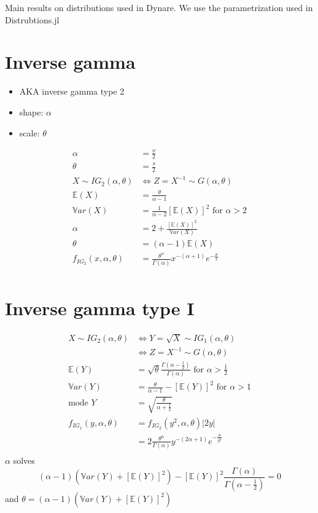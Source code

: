 \documentclass{article}
\begin{document}
Main results on distributions used in Dynare. We use the
parametrization used in Distrubtions.jl

\section{Inverse gamma}
\begin{itemize}
\item AKA inverse gamma type 2
\item shape: $\alpha$
\item scale: $\theta$
\end{itemize}
\begin{align*}
\alpha &= \frac{\nu}{2}\\
\theta &= \frac{s}{2}\\
X \sim IG_2(\alpha, \theta) &\Leftrightarrow Z = X^{-1} \sim G(\alpha, \theta)\\
\mathbb{E}(X) &= \frac{\theta}{\alpha - 1}\\
\mathbb{V}ar(X) &= \frac{1}{\alpha - 2}[\mathbb{E}(X)]^2 \mbox{ for
                  }\alpha > 2\\
  \alpha &= 2+\frac{[\mathbb{E}(X)]^2}{\mathbb{V}ar(X)}\\
  \theta &= (\alpha - 1)\mathbb{E}(X)\\
f_{IG_2}(x, \alpha, \theta) &=
                      \frac{\theta^\alpha}{\Gamma(\alpha)}x^{-(\alpha+1)}e^{-\frac{\theta}{x}}\\
\end{align*}

\section{Inverse gamma type I}
\begin{align*}
  X \sim IG_2(\alpha, \theta) &\Leftrightarrow Y = \sqrt{X} \sim IG_1(\alpha, \theta)\\
                              & \Leftrightarrow Z = X^{-1} \sim G(\alpha, \theta)\\
\mathbb{E}(Y) &= \sqrt{\theta}\frac{\Gamma(\alpha-\frac{1}{2})}{\Gamma(\alpha)} \mbox{ for }\alpha > \frac{1}{2} \\
\mathbb{V}ar(Y) &= \frac{\theta}{\alpha - 1} - [\mathbb{E}(Y)]^2 \mbox{ for }\alpha > 1\\
\mbox{mode }Y &= \sqrt{\frac{\theta}{\alpha + \frac{1}{2}}}\\
  f_{IG_1}(y, \alpha, \theta) &= f_{IG_2}(y^2, \alpha, \theta)|2y|\\
  &= 2\frac{\theta^\alpha}{\Gamma(\alpha)}y^{-(2\alpha+1)}e^{-\frac{\theta}{y^2}}\\
\end{align*}
$\alpha$ solves
\[
(\alpha - 1)\left(\mathbb{V}ar(Y) + [\mathbb{E}(Y)]^2\right)-
\left[\mathbb{E}(Y)\right]^2\frac{\Gamma(\alpha)}{\Gamma(\alpha-\frac{1}{2})} =0
\]
and $\theta = (\alpha - 1)(\mathbb{V}ar(Y) + [\mathbb{E}(Y)]^2)$
\end{document}
